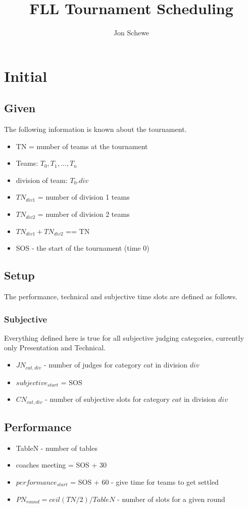 \documentclass[letterpaper,11pt]{report}
\title{FLL Tournament Scheduling}
\author{Jon Schewe}
\begin{document}
\maketitle

\chapter{Initial}
\section{Given}
The following information is known about the tournament.

\begin{itemize}
\item TN = number of teams at the tournament
\item Teams: $T_{0}, T_{1}, ..., T_{n}$
\item division of team: $T_{0}.div$
\item $TN_{div1}$ = number of division 1 teams
\item $TN_{div2}$ = number of division 2 teams
\item $TN_{div1} + TN_{div2}$ == TN
\item SOS - the start of the tournament (time 0)
\end{itemize}

\section{Setup}
The performance, technical and subjective time slots are defined as
follows.

\subsection{Subjective}

Everything defined here is true for all subjective judging categories, currently only Presentation and Technical.

\begin{itemize}
\item $JN_{cat,div}$ - number of judges for category $cat$ in division $div$
\item $subjective_{start}$ = SOS
\item $CN_{cat,div}$ - number of subjective slots for category $cat$ in division $div$
\end{itemize}

\section{Performance}
\begin{itemize}
\item TableN - number of tables
\item coaches meeting = SOS + 30
\item $performance_{start}$ = SOS + 60 - give time for teams to get settled
\item $PN_{round} = ceil(TN / 2) / TableN$ - number of slots for a given round
\end{itemize}
\end{document}
